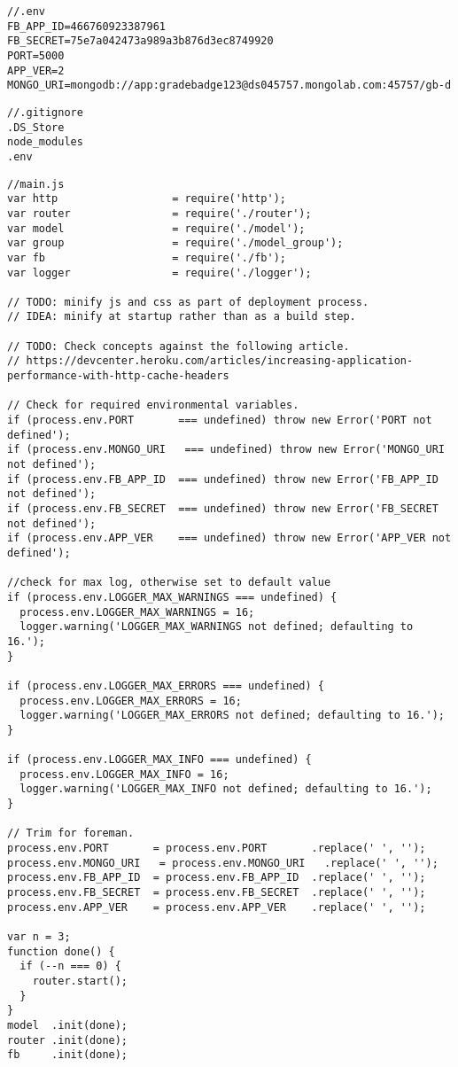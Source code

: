 \small
\lstset{basicstyle=\ttfamily,breaklines=true}

\begin{lstlisting}
//.env
FB_APP_ID=466760923387961
FB_SECRET=75e7a042473a989a3b876d3ec8749920
PORT=5000
APP_VER=2
MONGO_URI=mongodb://app:gradebadge123@ds045757.mongolab.com:45757/gb-d
\end{lstlisting}

\begin{lstlisting}
//.gitignore
.DS_Store
node_modules
.env
\end{lstlisting}

\begin{lstlisting}
//main.js
var http                  = require('http');
var router                = require('./router');
var model                 = require('./model');
var group                 = require('./model_group');
var fb                    = require('./fb');
var logger                = require('./logger');

// TODO: minify js and css as part of deployment process.
// IDEA: minify at startup rather than as a build step.

// TODO: Check concepts against the following article.
// https://devcenter.heroku.com/articles/increasing-application-performance-with-http-cache-headers

// Check for required environmental variables.
if (process.env.PORT       === undefined) throw new Error('PORT not defined');
if (process.env.MONGO_URI   === undefined) throw new Error('MONGO_URI not defined');
if (process.env.FB_APP_ID  === undefined) throw new Error('FB_APP_ID not defined');
if (process.env.FB_SECRET  === undefined) throw new Error('FB_SECRET not defined');
if (process.env.APP_VER    === undefined) throw new Error('APP_VER not defined');

//check for max log, otherwise set to default value
if (process.env.LOGGER_MAX_WARNINGS === undefined) {
  process.env.LOGGER_MAX_WARNINGS = 16;
  logger.warning('LOGGER_MAX_WARNINGS not defined; defaulting to 16.');
}

if (process.env.LOGGER_MAX_ERRORS === undefined) {
  process.env.LOGGER_MAX_ERRORS = 16;
  logger.warning('LOGGER_MAX_ERRORS not defined; defaulting to 16.');
}

if (process.env.LOGGER_MAX_INFO === undefined) {
  process.env.LOGGER_MAX_INFO = 16;
  logger.warning('LOGGER_MAX_INFO not defined; defaulting to 16.');
}

// Trim for foreman.
process.env.PORT       = process.env.PORT       .replace(' ', '');
process.env.MONGO_URI   = process.env.MONGO_URI   .replace(' ', '');
process.env.FB_APP_ID  = process.env.FB_APP_ID  .replace(' ', '');
process.env.FB_SECRET  = process.env.FB_SECRET  .replace(' ', '');
process.env.APP_VER    = process.env.APP_VER    .replace(' ', '');

var n = 3;
function done() {
  if (--n === 0) {
    router.start();
  }  
}
model  .init(done);
router .init(done);
fb     .init(done);

\end{lstlisting}

